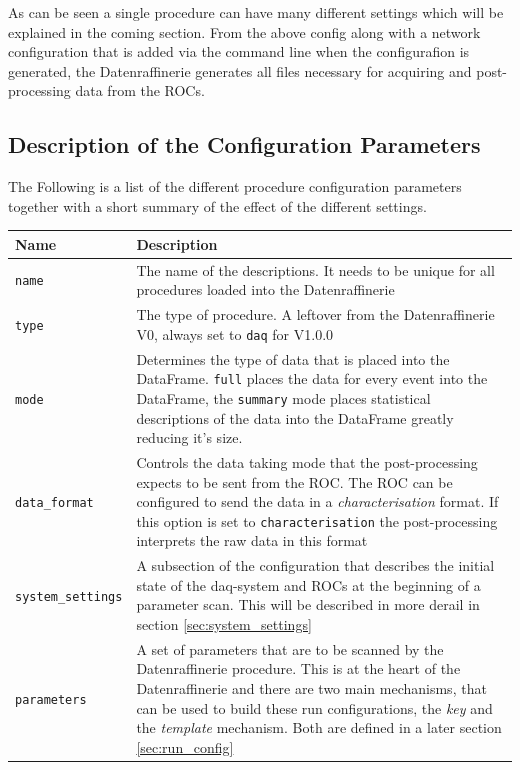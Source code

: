\documentclass[11pt]{article}
\begin{document}
As can be seen a single procedure can have many different settings which will be explained in the coming section. From the above config along with a network configuration that is added via the command line when the configurafion is generated, the Datenraffinerie generates all files necessary for acquiring and post-processing data from the ROCs.

\subsection{Description of the Configuration Parameters}
The Following is a list of the different procedure configuration parameters together with a short summary of the effect of the different settings.

\begin{center}
\begin{tabular}{| m{3cm} | m{10cm} |}
Name & Description \\
\hline	\hline
\verb|name| & The name of the descriptions. It needs to be unique for all procedures loaded into the Datenraffinerie \\ \hline
\verb|type| & The type of procedure. A leftover from the Datenraffinerie V0, always set to \verb|daq| for V1.0.0 \\ \hline
\verb|mode| & Determines the type of data that is placed into the DataFrame. \verb|full| places the data for every event into the DataFrame, the \verb|summary| mode places statistical descriptions of the data into the DataFrame greatly reducing it's size. \\ \hline
\verb|data_format| & Controls the data taking mode that the post-processing expects to be sent from the ROC. The ROC can be configured to send the data in a \emph{characterisation} format. If this option is set to \verb|characterisation| the post-processing interprets the raw data in this format \\ \hline
\verb|system_settings| & A subsection of the configuration that describes the initial state of the daq-system and ROCs at the beginning of a parameter scan. This will be described in more derail in section \ref{sec:system_settings}\\ \hline
\verb|parameters| & A set of parameters that are to be scanned by the Datenraffinerie procedure. This is at the heart of the Datenraffinerie and there are two main mechanisms, that can be used to build these run configurations, the \emph{key} and the \emph{template} mechanism. Both are defined in a later section \ref{sec:run_config} \\ \hline

\end{tabular}
\end{center}
\end{document}

